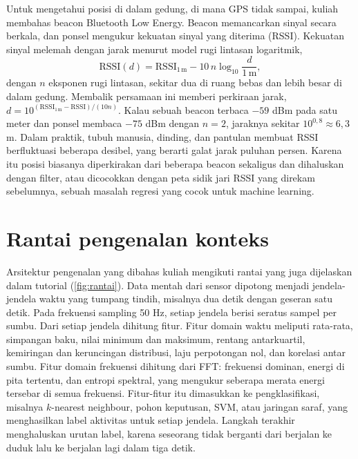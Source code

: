 Untuk mengetahui posisi di dalam gedung, di mana GPS tidak sampai, kuliah membahas beacon Bluetooth Low Energy.
Beacon memancarkan sinyal secara berkala, dan ponsel mengukur kekuatan sinyal yang diterima (RSSI). Kekuatan sinyal
melemah dengan jarak menurut model rugi lintasan logaritmik,
\begin{equation}
\mathrm{RSSI}(d)=\mathrm{RSSI}_{1\,\mathrm m}-10\,n\log_{10}\frac{d}{1\,\mathrm m},
\end{equation}
dengan $n$ eksponen rugi lintasan, sekitar dua di ruang bebas dan lebih besar di dalam gedung. Membalik persamaan
ini memberi perkiraan jarak, $d=10^{(\mathrm{RSSI}_{1\,\mathrm m}-\mathrm{RSSI})/(10n)}$. Kalau sebuah beacon
terbaca $-59$ dBm pada satu meter dan ponsel membaca $-75$ dBm dengan $n=2$, jaraknya sekitar $10^{0{,}8}\approx6{,}3$ m.
Dalam praktik, tubuh manusia, dinding, dan pantulan membuat RSSI berfluktuasi beberapa desibel, yang berarti galat
jarak puluhan persen. Karena itu posisi biasanya diperkirakan dari beberapa beacon sekaligus dan dihaluskan dengan
filter, atau dicocokkan dengan peta sidik jari RSSI yang direkam sebelumnya, sebuah masalah regresi yang cocok untuk
machine learning.

\section{Rantai pengenalan konteks}

Arsitektur pengenalan yang dibahas kuliah mengikuti rantai yang juga dijelaskan dalam tutorial \citet{bulling2014}
(\cref{fig:rantai}). Data mentah dari sensor dipotong menjadi jendela-jendela waktu yang tumpang tindih, misalnya dua
detik dengan geseran satu detik. Pada frekuensi sampling 50 Hz, setiap jendela berisi seratus sampel per sumbu.
Dari setiap jendela dihitung fitur. Fitur domain waktu meliputi rata-rata, simpangan baku, nilai minimum dan
maksimum, rentang antarkuartil, kemiringan dan keruncingan distribusi, laju perpotongan nol, dan korelasi antar
sumbu. Fitur domain frekuensi dihitung dari FFT: frekuensi dominan, energi di pita tertentu, dan entropi spektral,
yang mengukur seberapa merata energi tersebar di semua frekuensi. Fitur-fitur itu dimasukkan ke pengklasifikasi,
misalnya $k$-nearest neighbour, pohon keputusan, SVM, atau jaringan saraf, yang menghasilkan label aktivitas untuk
setiap jendela. Langkah terakhir menghaluskan urutan label, karena seseorang tidak berganti dari berjalan ke duduk
lalu ke berjalan lagi dalam tiga detik.


